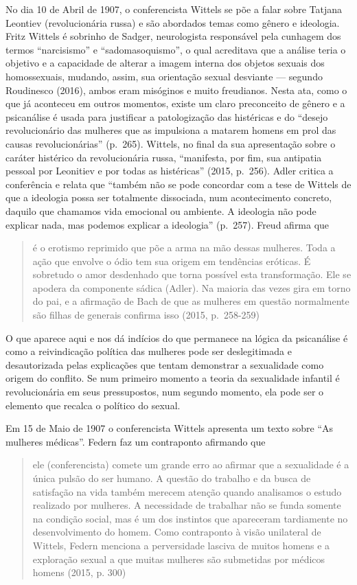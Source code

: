 No dia 10 de Abril de 1907, o conferencista Wittels se põe a falar sobre
Tatjana Leontiev (revolucionária russa) e são abordados temas como
gênero e ideologia. Fritz Wittels é sobrinho de Sadger, neurologista
responsável pela cunhagem dos termos ``narcisismo'' e
``sadomasoquismo'', o qual acreditava que a análise teria o objetivo e a
capacidade de alterar a imagem interna dos objetos sexuais dos
homossexuais, mudando, assim, sua orientação sexual desviante ---
segundo Roudinesco (2016), ambos eram misóginos e muito freudianos.
Nesta ata, como o que já aconteceu em outros momentos, existe um claro
preconceito de gênero e a psicanálise é usada para justificar a
patologização das histéricas e do ``desejo revolucionário das mulheres
que as impulsiona a matarem homens em prol das causas revolucionárias''
(p.~265). Wittels, no final da sua apresentação sobre o caráter histérico
da revolucionária russa, ``manifesta, por fim, sua antipatia pessoal por
Leonitiev e por todas as histéricas'' (2015, p.~256). Adler critica a
conferência e relata que ``também não se pode concordar com a tese de
Wittels de que a ideologia possa ser totalmente dissociada, num
acontecimento concreto, daquilo que chamamos vida emocional ou ambiente.
A ideologia não pode explicar nada, mas podemos explicar a ideologia''
(p.~257). Freud afirma que

\begin{quote}
é o erotismo reprimido que põe a arma na mão dessas mulheres. Toda a
ação que envolve o ódio tem sua origem em tendências eróticas. É
sobretudo o amor desdenhado que torna possível esta transformação. Ele
se apodera da componente sádica (Adler). Na maioria das vezes gira em
torno do pai, e a afirmação de Bach de que as mulheres em questão
normalmente são filhas de generais confirma isso (2015, p.~258-259)
\end{quote}

O que aparece aqui e nos dá indícios do que permanece na lógica da
psicanálise é como a reivindicação política das mulheres pode ser
deslegitimada e desautorizada pelas explicações que tentam demonstrar a
sexualidade como origem do conflito. Se num primeiro momento a teoria da
sexualidade infantil é revolucionária em seus pressupostos, num segundo
momento, ela pode ser o elemento que recalca o político do sexual.

Em 15 de Maio de 1907 o conferencista Wittels apresenta um texto sobre
``As mulheres médicas''. Federn faz um contraponto afirmando que

\begin{quote}
ele (conferencista) comete um grande erro ao afirmar que a sexualidade é
a única pulsão do ser humano. A questão do trabalho e da busca de
satisfação na vida também merecem atenção quando analisamos o estudo
realizado por mulheres. A necessidade de trabalhar não se funda somente
na condição social, mas é um dos instintos que apareceram tardiamente no
desenvolvimento do homem. Como contraponto à visão unilateral de
Wittels, Federn menciona a perversidade lasciva de muitos homens e a
exploração sexual a que muitas mulheres são submetidas por médicos
homens (2015, p. 300)
\end{quote}

